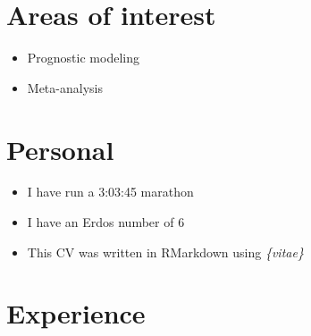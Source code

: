 \documentclass[11pt,a4paper,]{awesome-cv}
\providecommand{\tightlist}{%
	\setlength{\itemsep}{0pt}\setlength{\parskip}{0pt}}
\begin{document}
\section{Areas of interest}\label{areas-of-interest}

\begin{itemize}
\tightlist
\item
  Prognostic modeling
\item
  Meta-analysis
\end{itemize}

\section{Personal}\label{personal}

\begin{itemize}
\tightlist
\item
  I have run a 3:03:45 marathon
\item
  I have an Erdos number of 6
\item
  This CV was written in RMarkdown using \emph{\{vitae\}}
\end{itemize}

\section{Experience}\label{experience-1}
\end{document}

